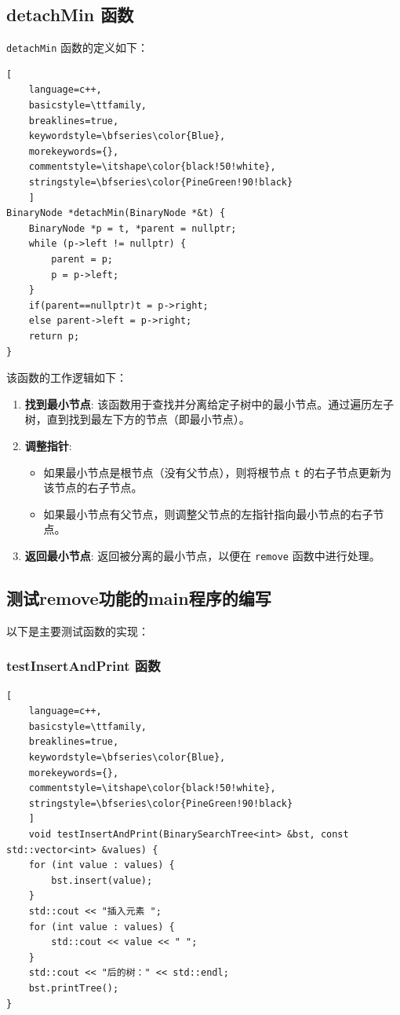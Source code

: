 \documentclass[UTF8]{ctexart}
\begin{document}
\subsection{detachMin 函数}
\texttt{detachMin} 函数的定义如下：

\begin{lstlisting}[ 
    language=c++,
    basicstyle=\ttfamily,
    breaklines=true,
    keywordstyle=\bfseries\color{Blue}, 
    morekeywords={}, 
    commentstyle=\itshape\color{black!50!white},
    stringstyle=\bfseries\color{PineGreen!90!black} 
    ]
BinaryNode *detachMin(BinaryNode *&t) {
    BinaryNode *p = t, *parent = nullptr;
    while (p->left != nullptr) {
        parent = p;
        p = p->left;
    }
    if(parent==nullptr)t = p->right;
    else parent->left = p->right;
    return p;
}
\end{lstlisting}

该函数的工作逻辑如下：

\begin{enumerate}
    \item \textbf{找到最小节点}: 该函数用于查找并分离给定子树中的最小节点。通过遍历左子树，直到找到最左下方的节点（即最小节点）。
    \item \textbf{调整指针}: 
    \begin{itemize}
        \item 如果最小节点是根节点（没有父节点），则将根节点 \texttt{t} 的右子节点更新为该节点的右子节点。
        \item 如果最小节点有父节点，则调整父节点的左指针指向最小节点的右子节点。
    \end{itemize}
    \item \textbf{返回最小节点}: 返回被分离的最小节点，以便在 \texttt{remove} 函数中进行处理。
\end{enumerate}


\subsection{测试remove功能的main程序的编写}
以下是主要测试函数的实现：

\subsubsection{testInsertAndPrint 函数}
\begin{lstlisting}[ 
    language=c++,
    basicstyle=\ttfamily,
    breaklines=true,
    keywordstyle=\bfseries\color{Blue}, 
    morekeywords={}, 
    commentstyle=\itshape\color{black!50!white},
    stringstyle=\bfseries\color{PineGreen!90!black} 
    ]
    void testInsertAndPrint(BinarySearchTree<int> &bst, const std::vector<int> &values) {
    for (int value : values) {
        bst.insert(value);
    }
    std::cout << "插入元素 ";
    for (int value : values) {
        std::cout << value << " ";
    }
    std::cout << "后的树：" << std::endl;
    bst.printTree();
}
\end{lstlisting}
\end{document}
